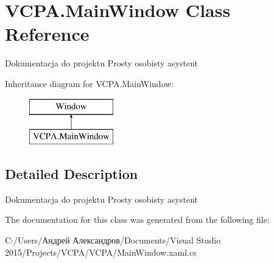 \hypertarget{class_v_c_p_a_1_1_main_window}{}\section{V\+C\+P\+A.\+Main\+Window Class Reference}
\label{class_v_c_p_a_1_1_main_window}


Dokumentacja do projektu Prosty osobisty asystent  


Inheritance diagram for V\+C\+P\+A.\+Main\+Window\+:\begin{figure}[H]
\begin{center}
\leavevmode
\includegraphics[height=2.000000cm]{class_v_c_p_a_1_1_main_window}
\end{center}
\end{figure}


\subsection{Detailed Description}
Dokumentacja do projektu Prosty osobisty asystent 



The documentation for this class was generated from the following file\+:\begin{DoxyCompactItemize}
\item 
C\+:/\+Users/Андрей Александров/\+Documents/\+Visual Studio 2015/\+Projects/\+V\+C\+P\+A/\+V\+C\+P\+A/Main\+Window.\+xaml.\+cs\end{DoxyCompactItemize}
